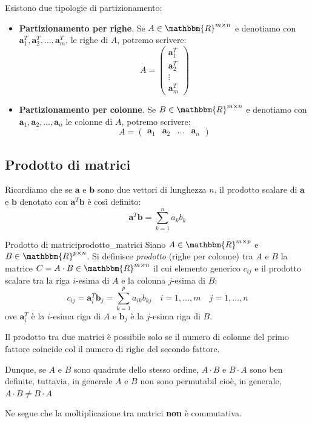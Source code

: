 \documentclass[12pt]{report}
\newcounter{definition}
\newcommand{\nmu}{}
\begin{document}
Esistono due tipologie di partizionamento:
\begin{itemize}
	\item \textbf{Partizionamento per righe}. Se $A \in \mathbbm{R}^{m\times n}$ e denotiamo con $\mathbf{a}_1^T, \mathbf{a}_2^T, \dots, \mathbf{a}_m^T$, le righe di $A$, potremo scrivere:
	\[
	A = \begin{pmatrix}
				\mathbf{a}_1^T \\
				\mathbf{a}_2^T \\
				\vdots \\
				\mathbf{a}_m^T
			\end{pmatrix}
	\]
	\item \textbf{Partizionamento per colonne}. Se $B \in \mathbbm{R}^{m \times n}$ e denotiamo con $\mathbf{a}_1, \mathbf{a}_2, \dots, \mathbf{a}_n$ le colonne di $A$, potremo scrivere:
	\[
	A = \begin{pmatrix}\mathbf{a}_1 & \mathbf{a}_2 & \dots & \mathbf{a}_n\end{pmatrix}
	\]
\end{itemize}
\subsection{Prodotto di matrici}
Ricordiamo che se $\mathbf{a}$ e $\mathbf{b}$ sono due vettori di lunghezza $n$, il prodotto scalare di $\mathbf{a}$ e $\mathbf{b}$ denotato con $\mathbf{a}^T\mathbf{b}$ è così definito:
\[
\mathbf{a}^T\mathbf{b} = \displaystyle\sum_{k=1}^{n}a_kb_k
\]
\begin{definition}{\nmu Prodotto di matrici}{prodotto_matrici}
	Siano $A \in \mathbbm{R}^{m \times p}$ e $B \in \mathbbm{R}^{p \times n}$. Si definisce \textit{prodotto} (righe per colonne) tra $A$ e $B$ la matrice $C = A \cdot B \in \mathbbm{R}^{m \times n}$ il cui elemento generico $c_{ij}$ e il prodotto scalare tra la riga $i$-esima di $A$ e la colonna $j$-esima di $B$:
	\[
	c_{ij} = \mathbf{a}_i^T\mathbf{b}_j = \displaystyle\sum_{k=1}^{p}a_{ik}b_{kj} \quad i = 1, \dots, m \quad j = 1, \dots, n
	\]
	ove $\mathbf{a}_i^T$ è la $i$-esima riga di $A$ e $\mathbf{b}_j$ è la $j$-esima riga di $B$.
\end{definition}
\begin{note}{}{}
Il prodotto tra due matrici è possibile solo se il numero di colonne del primo fattore coincide col il numero di righe del secondo fattore.

Dunque, se $A$ e $B$ sono quadrate dello stesso ordine, $A \cdot B$ e $B \cdot A$ sono ben definite, tuttavia, in generale $A$ e $B$ non sono permutabil cioè, in generale, $A \cdot B \neq B \cdot A$

Ne segue che la moltiplicazione tra matrici \textbf{non} è commutativa.
\end{note}
\end{document}
